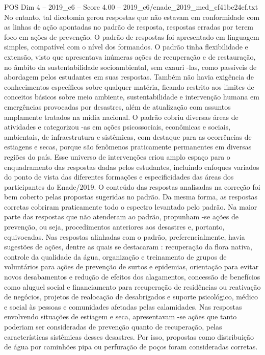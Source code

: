 \begin{textsample}{POS Dim 4 – 2019\_c6 – Score 4.00 – 2019\_c6/enade\_2019\_med\_cf41be24ef.txt}
No entanto, tal dicotomia gerou respostas que não estavam em conformidade com as linhas de ação apontadas no padrão de resposta, respostas erradas por terem foco em ações de prevenção.
O padrão de respostas foi apresentado em linguagem simples, compatível com o nível dos formandos.
O padrão tinha flexibilidade e extensão, visto que apresentava inúmeras ações de recuperação e de restauração, no âmbito da sustentabilidade socioambiental, sem exauri -las, como passíveis de abordagem pelos estudantes em suas respostas.
Também não havia exigência de conhecimentos específicos sobre qualquer matéria, ficando restrito aos limites de conceitos básicos sobre meio ambiente, sustentabilidade e intervenção humana em emergências provocadas por desastres, além de atualização com assuntos amplamente tratados na mídia nacional.
O padrão cobriu diversas áreas de atividades e categorizou -as em ações psicossociais, econômicas e sociais, ambientais, de infraestrutura e sistêmicas, com destaque para as ocorrências de estiagens e secas, porque são fenômenos praticamente permanentes em diversas regiões do país.
Esse universo de intervenções criou amplo espaço para o enquadramento das respostas dadas pelos estudantes, incluindo enfoques variados do ponto de vista das diferentes formações e especificidades das áreas dos participantes do Enade/2019.
O conteúdo das respostas analisadas na correção foi bem coberto pelas propostas sugeridas no padrão.
Da mesma forma, as respostas corretas cobriram praticamente todo o espectro levantado pelo padrão.
Na maior parte das respostas que não atenderam ao padrão, propunham -se ações de prevenção, ou seja, procedimentos anteriores aos desastres e, portanto, equivocadas.
Nas respostas alinhadas com o padrão, preferencialmente, havia sugestões de ações, dentre as quais se destacaram : recuperação da flora nativa, controle da qualidade da água, organização e treinamento de grupos de voluntários para ações de prevenção de surtos e epidemias, orientação para evitar novos desabamentos e redução de efeitos dos alagamentos, concessão de benefícios como aluguel social e financiamento para recuperação de residências ou reativação de negócios, projetos de realocação de desabrigados e suporte psicológico, médico e social às pessoas e comunidades afetadas pelas calamidades.
Nas respostas envolvendo situações de estiagem e seca, apresentavam -se ações que tanto poderiam ser consideradas de prevenção quanto de recuperação, pelas características sistêmicas desses desastres.
Por isso, propostas como distribuição de água por caminhões pipa ou perfuração de poços foram consideradas corretas.

\end{textsample}
